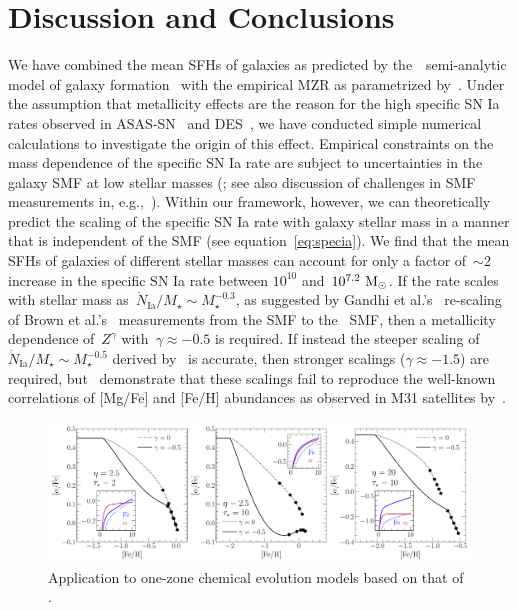 \documentclass[ms.tex]{subfiles}
\begin{document}
\section{Discussion and Conclusions}
\label{sec:conclusions}

We have combined the mean SFHs of galaxies as predicted by the~\um~semi-analytic
model of galaxy formation~\citep{Behroozi2019} with the empirical MZR as
parametrized by~\citet{Zahid2014}.
Under the assumption that metallicity effects are the reason for the high
specific SN Ia rates observed in ASAS-SN~\citep{Brown2019, Gandhi2022} and
DES~\citep{Wiseman2021}, we have conducted simple numerical calculations to
investigate the origin of this effect.
Empirical constraints on the mass dependence of the specific SN Ia rate are
subject to uncertainties in the galaxy SMF at low stellar masses
(\citealp{Gandhi2022}; see also discussion of challenges in SMF measurements
in, e.g.,~\citealp{Weigel2016}).
Within our framework, however, we can theoretically predict the scaling of the
specific SN Ia rate with galaxy stellar mass in a manner that is independent of
the SMF (see equation~\ref{eq:specia}).
We find that the mean SFHs of galaxies of different stellar masses can account
for only a factor of~$\sim$2 increase in the specific SN Ia rate between
$10^{10}$ and~$10^{7.2}~\text{M}_\odot$.
If the rate scales with stellar mass as~$\dot{N}_\text{Ia} / M_\star \sim
M_\star^{-0.3}$, as suggested by Gandhi et al.'s~\citeyearpar{Gandhi2022}
re-scaling of Brown et al.'s~\citeyearpar{Brown2019} measurements from the
\citet{Bell2003} SMF to the~\citet{Baldry2012} SMF, then a metallicity
dependence of~$Z^\gamma$ with~$\gamma \approx -0.5$ is required.
If instead the steeper scaling of~$\dot{N}_\text{Ia} / M_\star \sim
M_\star^{-0.5}$ derived by~\citet{Brown2019} is accurate, then stronger
scalings ($\gamma \approx -1.5$) are required, but~\citet{Gandhi2022}
demonstrate that these scalings fail to reproduce the well-known correlations
of [Mg/Fe] and [Fe/H] abundances as observed in M31 satellites
by~\citet*{Vargas2014}.

\begin{figure}
\centering
\includegraphics[scale = 0.5]{onezone_application.pdf}
\caption{
Application to one-zone chemical evolution models based on that of
\citet{Johnson2020}.
}
\label{fig:onezone_app}
\end{figure}
\end{document}
